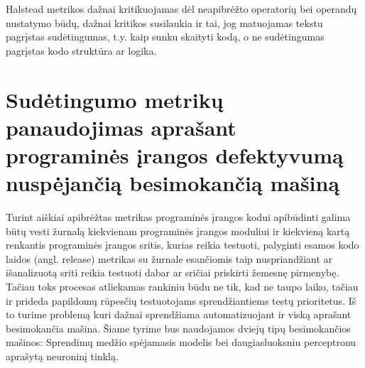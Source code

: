 \documentclass{VUMIFPSbakalaurinis}
\begin{document}
Halstead metrikos dažnai kritikuojamas dėl neapibrėžto operatorių bei operandų nustatymo būdų, dažnai kritikos susilaukia ir tai, jog matuojamas tekstu pagrįstas sudėtingumas, t.y. kaip sunku skaityti kodą, o ne sudėtingumas pagrįstas kodo struktūra ar logika.

\section{Sudėtingumo metrikų panaudojimas aprašant programinės įrangos defektyvumą nuspėjančią besimokančią mašiną}

Turint aiškiai apibrėžtas metrikas programinės įrangos kodui apibūdinti galima būtų vesti žurnalą kiekvienam programinės įrangos moduliui ir kiekvieną kartą renkantis programinės įrangos sritis, kurias reikia testuoti, palyginti esamos kodo laidos (angl. release) metrikas su žurnale esančiomis taip nuspriandžiant ar išanalizuotą sriti reikia testuoti dabar ar sričiai priskirti žemesnę pirmenybę. Tačiau toks procesas atliekamas rankiniu būdu ne tik, kad ne taupo laiko, tačiau ir prideda papildomų rūpesčių testuotojams sprendžiantiems testų prioritetus. Iš to turime problemą kuri dažnai sprendžiama automatizuojant ir viską aprašant besimokančia mašina. Šiame tyrime bus naudojamos dviejų tipų besimokančios mašinos: Sprendimų medžio spėjamasis modelis bei daugiasluoksniu perceptronu aprašytą neuroninį tinklą.
\end{document}
